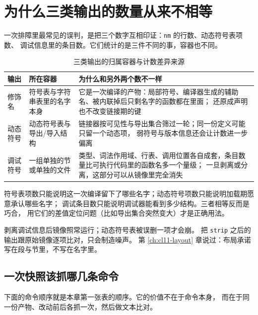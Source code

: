 \documentclass[12pt,a4paper,fontset=fandol]{ctexbook}
\newcommand{\Tool}[1]{\texttt{#1}}
\begin{document}
\section{为什么三类输出的数量从来不相等}

一次排障里最常见的误判，是把三个数字互相印证：\Tool{nm}{} 的行数、动态符号表项数、
调试信息里的条目数。它们统计的是三件不同的事，容器也不同。

\begin{table}[htbp]
\centering
\begin{tabularx}{\textwidth}{@{}>{\raggedright\arraybackslash}p{} >{\raggedright\arraybackslash}p{} X@{}}
\toprule
输出 & 所在容器 & 为什么和另外两个数不一样 \\
\midrule
修饰名 & 符号表与字符串表里的名字本身 &
它是一次编译的产物：局部符号、编译器生成的辅助名、被内联掉后只剩名字的函数都在里面；
还原成声明也不改变链接期的键 \\
动态符号 & 动态符号表与导出/导入结构 &
链接器按可见性与导出集合筛过一轮；同一份定义可能只留一个动态项，
弱符号与版本信息还会让计数进一步偏离 \\
调试符号 & 一组单独的节或单独的文件 &
类型、词法作用域、行表、调用位置各自成套，条目数量比可执行代码里的函数名多一个量级；
一旦剥离或分离，这部分可以从镜像里完全消失 \\
\bottomrule
\end{tabularx}
\caption{三类输出的归属容器与计数差异来源}\label{tab:apA-three}
\end{table}

\begin{compare}[title=三个计数各自能说明什么]
符号表项数只能说明这一次编译留下了哪些名字；动态符号项数只能说明加载期愿意承认哪些名字；
调试条目数只能说明调试器能看到多少结构。三者相等反而是巧合，
用它们的差值定位问题（比如导出集合突然变大）才是正确用法。
\end{compare}

\begin{warning}[title=数量差不是错误，缺了才是]
剥离调试信息后镜像照常运行；动态符号表被误删一项才会崩。
把 \Tool{strip}{} 之后的输出跟原始镜像逐项比对，只会制造噪声。
第 \ref{ch:cl11-layout} 章说过：布局承诺写在段与节里，不写在名字里。
\end{warning}

\subsection*{一次快照该抓哪几条命令}

下面的命令顺序就是本章第一张表的顺序。它的价值不在于命令本身，
而在于同一份产物、改动前后各抓一次，然后做文本比对。
\end{document}

